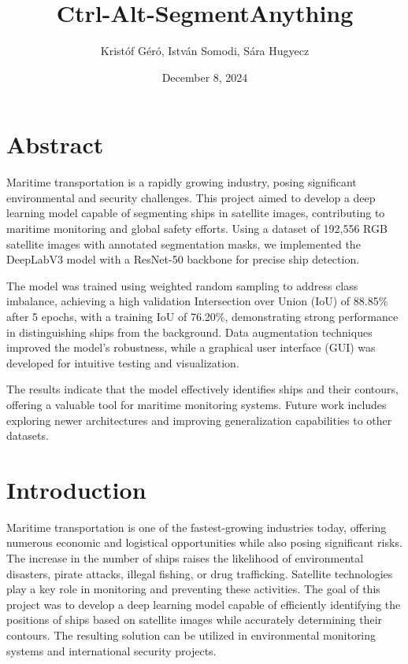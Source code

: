 \documentclass{article}
\title{Ctrl-Alt-SegmentAnything}
\author{Kristóf Géró, István Somodi, Sára Hugyecz}
\date{December 8, 2024}
\begin{document}
\maketitle

\section{Abstract}

Maritime transportation is a rapidly growing industry, posing significant environmental and security challenges. This project aimed to develop a deep learning model capable of segmenting ships in satellite images, contributing to maritime monitoring and global safety efforts. Using a dataset of 192,556 RGB satellite images with annotated segmentation masks, we implemented the DeepLabV3 model with a ResNet-50 backbone for precise ship detection.

The model was trained using weighted random sampling to address class imbalance, achieving a high validation Intersection over Union (IoU) of 88.85\% after 5 epochs, with a training IoU of 76.20\%, demonstrating strong performance in distinguishing ships from the background. Data augmentation techniques improved the model's robustness, while a graphical user interface (GUI) was developed for intuitive testing and visualization.

The results indicate that the model effectively identifies ships and their contours, offering a valuable tool for maritime monitoring systems. Future work includes exploring newer architectures and improving generalization capabilities to other datasets.


\section{Introduction}

Maritime transportation is one of the fastest-growing industries today, offering numerous economic and logistical opportunities while also posing significant risks. The increase in the number of ships raises the likelihood of environmental disasters, pirate attacks, illegal fishing, or drug trafficking. Satellite technologies play a key role in monitoring and preventing these activities. The goal of this project was to develop a deep learning model capable of efficiently identifying the positions of ships based on satellite images while accurately determining their contours. The resulting solution can be utilized in environmental monitoring systems and international security projects.
\end{document}

